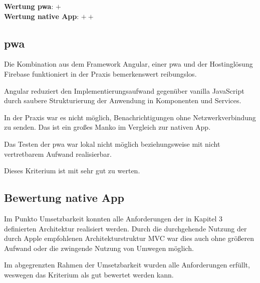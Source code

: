 \textbf{Wertung \ac{pwa}}: $+$\\
\textbf{Wertung native App}: $++$ \\

\subsection{\ac{pwa}}
Die Kombination aus dem Framework Angular, einer \ac{pwa} und der Hostinglösung Firebase funktioniert in der Praxis bemerkenswert reibungslos.

Angular reduziert den Implementierungsaufwand gegenüber vanilla JavaScript durch saubere Strukturierung der Anwendung in Komponenten und Services.

In der Praxis war es nicht möglich, Benachrichtigungen ohne Netzwerkverbindung zu senden. Das ist ein großes Manko im Vergleich zur nativen App.

Das Testen der \ac{pwa} war lokal nicht möglich beziehungsweise mit nicht vertretbarem Aufwand realisierbar.

Dieses Kriterium ist mit sehr gut zu werten.

\subsection{Bewertung native App}
Im Punkto Umsetzbarkeit konnten alle Anforderungen der in Kapitel 3 definierten Architektur realisiert werden. Durch die durchgehende Nutzung der durch Apple empfohlenen Architekturstruktur MVC war dies auch ohne größeren Aufwand oder die zwingende Nutzung von Umwegen möglich.

Im abgegrenzten Rahmen der Umsetzbarkeit wurden alle Anforderungen erfüllt, weswegen das Kriterium als gut bewertet werden kann.